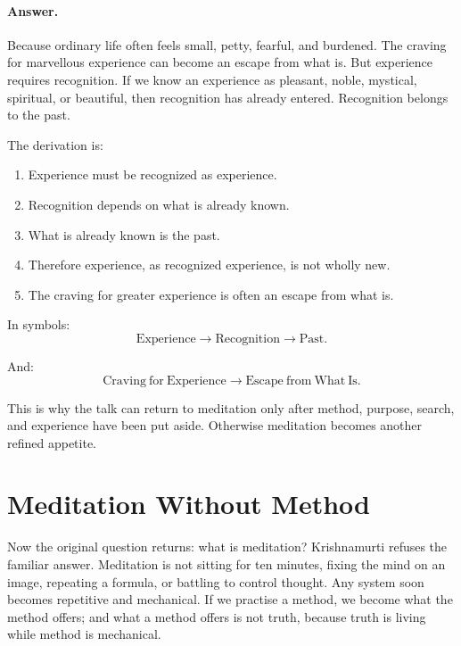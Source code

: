 \paragraph{Answer.}
Because ordinary life often feels small, petty, fearful, and burdened. The craving for marvellous experience can become an escape from what is. But experience requires recognition. If we know an experience as pleasant, noble, mystical, spiritual, or beautiful, then recognition has already entered. Recognition belongs to the past.

The derivation is:
\begin{enumerate}
\item Experience must be recognized as experience.
\item Recognition depends on what is already known.
\item What is already known is the past.
\item Therefore experience, as recognized experience, is not wholly new.
\item The craving for greater experience is often an escape from what is.
\end{enumerate}

In symbols:
\begin{equation}
\mathrm{Experience}
\longrightarrow
\mathrm{Recognition}
\longrightarrow
\mathrm{Past}.
\end{equation}

And:
\begin{equation}
\mathrm{Craving\ for\ Experience}
\longrightarrow
\mathrm{Escape\ from\ What\ Is}.
\end{equation}

This is why the talk can return to meditation only after method, purpose, search, and experience have been put aside. Otherwise meditation becomes another refined appetite.

\section{Meditation Without Method}

Now the original question returns: what is meditation? Krishnamurti refuses the familiar answer. Meditation is not sitting for ten minutes, fixing the mind on an image, repeating a formula, or battling to control thought. Any system soon becomes repetitive and mechanical. If we practise a method, we become what the method offers; and what a method offers is not truth, because truth is living while method is mechanical.

